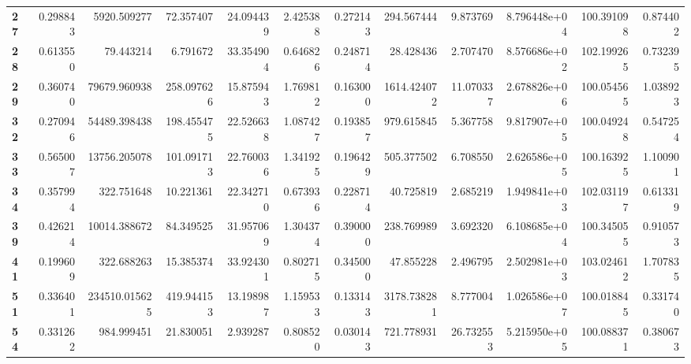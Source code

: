 \begin{table}[h]
\begin{tabular}{lrrrrrrrrrrr}
\textbf{27} &  0.298843 &    5920.509277 &       72.357407 &                  24.094439 &  2.425388 &  0.272143 &   294.567444 &   9.873769 &  8.796448e+04 &  100.391098 &     0.874402 \\
\textbf{28} &  0.613550 &      79.443214 &        6.791672 &                  33.354904 &  0.646826 &  0.248714 &    28.428436 &   2.707470 &  8.576686e+02 &  102.199265 &     0.732395 \\
\textbf{29} &  0.360740 &   79679.960938 &      258.097626 &                  15.875943 &  1.769812 &  0.163000 &  1614.424072 &  11.070337 &  2.678826e+06 &  100.054565 &     1.038923 \\
\textbf{32} &  0.270946 &   54489.398438 &      198.455475 &                  22.526638 &  1.087427 &  0.193857 &   979.615845 &   5.367758 &  9.817907e+05 &  100.049248 &     0.547254 \\
\textbf{33} &  0.565007 &   13756.205078 &      101.091713 &                  22.760036 &  1.341925 &  0.196429 &   505.377502 &   6.708550 &  2.626586e+05 &  100.163925 &     1.100901 \\
\textbf{34} &  0.357994 &     322.751648 &       10.221361 &                  22.342710 &  0.673936 &  0.228714 &    40.725819 &   2.685219 &  1.949841e+03 &  102.031197 &     0.613319 \\
\textbf{39} &  0.426214 &   10014.388672 &       84.349525 &                  31.957069 &  1.304374 &  0.390000 &   238.769989 &   3.692320 &  6.108685e+04 &  100.345055 &     0.910573 \\
\textbf{41} &  0.199609 &     322.688263 &       15.385374 &                  33.924301 &  0.802715 &  0.345000 &    47.855228 &   2.496795 &  2.502981e+03 &  103.024612 &     1.707835 \\
\textbf{51} &  0.336401 &  234510.015625 &      419.944153 &                  13.198987 &  1.159533 &  0.133143 &  3178.738281 &   8.777004 &  1.026586e+07 &  100.018845 &     0.331740 \\
\textbf{54} &  0.331262 &     984.999451 &       21.830051 &                   2.939287 &  0.808520 &  0.030143 &   721.778931 &  26.732553 &  5.215950e+05 &  100.088371 &     0.380673 \\
\bottomrule
\end{tabular}
\end{table}
